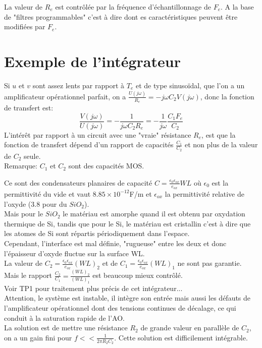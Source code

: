 \documentclass[main.tex]{subfiles}
\begin{document}

La valeur de $R_e$ est contrôlée par la fréquence d'échantillonnage de $F_e$. A la base de "filtres programmables" c'est à dire dont es caractéristiques peuvent être modifiées par $F_e$.\\

\section{Exemple de l'intégrateur}

Si $u$ et $v$ sont assez lents par rapport à $T_e$ et de type sinusoïdal, que l'on a un amplificateur opérationnel parfait, on a $\frac{U(j\omega)}{R_e} = -j\omega C_2V(j\omega)$, donc la fonction de transfert est:
\[\frac{V(j\omega)}{U(j\omega)} = -\frac{1}{j\omega C_2R_e} = -\frac{1}{j\omega}\frac{C_1F_e}{C_2}\]
L'intérêt par rapport à un circuit avec une "vraie" résistance $R_e$, est que la fonction de transfert dépend d'un rapport de capacités $\frac{C_1}{C_2}$ et non plus de la valeur de $C_2$ seule.\\

Remarque: $C_1$ et $C_2$ sont des capacités MOS.


Ce sont des condensateurs planaires de capacité $C=\frac{\epsilon_0 \epsilon_{ox} }{e_{ox}}WL$ où $\epsilon_0$ est la permittivité du vide et vaut $8.85\times 10^{-12}$F/m et $\epsilon_{ox}$ la permittivité relative de l'oxyde (3.8 pour du $SiO_2$).\\
Mais pour le $SiO_2$ le matériau est amorphe quand il est obtenu par oxydation thermique de Si, tandis que pour le Si, le matériau est cristallin c'est à dire que les atomes de Si sont répartis périodiquement dans l'espace.\\
Cependant, l'interface est mal définie, "rugueuse" entre les deux et donc l'épaisseur d'oxyde fluctue sur la surface WL.\\
La valeur de $C_2=\frac{\epsilon_0 \epsilon_{ox} }{e_{ox}}(WL)_2$ et de $C_1=\frac{\epsilon_0 \epsilon_{ox} }{e_{ox}}(WL)_1$ ne sont pas garantie. Mais le rapport $\frac{C_2}{C_1} = \frac{(WL)_2}{(WL)_1}$ est beaucoup mieux contrôlé.\\
Voir TP1 pour traitement plus précis de cet intégrateur...\\


Attention, le système est instable, il intègre son entrée mais aussi les défauts de l'amplificateur opérationnel dont des tensions continues de décalage, ce qui conduit à la saturation rapide de l'AO.\\
La solution est de mettre une résistance $R_2$ de grande valeur en parallèle de $C_2$, on a un gain fini pour $f<< \frac{1}{2\pi R_2C_2}$. Cette solution est difficilement intégrable.\\
\end{document}
